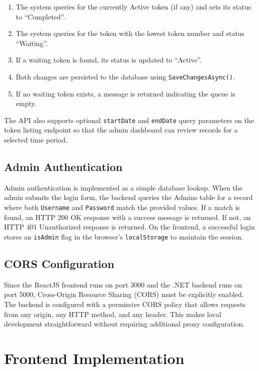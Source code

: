 \begin{enumerate}
    \item The system queries for the currently Active token (if any) and sets its status to ``Completed''.
    \item The system queries for the token with the lowest token number and status ``Waiting''.
    \item If a waiting token is found, its status is updated to ``Active''.
    \item Both changes are persisted to the database using \texttt{SaveChangesAsync()}.
    \item If no waiting token exists, a message is returned indicating the queue is empty.
\end{enumerate}

The API also supports optional \texttt{startDate} and \texttt{endDate} query parameters on the token listing endpoint so that the admin dashboard can review records for a selected time period.

\subsection{Admin Authentication}

Admin authentication is implemented as a simple database lookup. When the admin submits the login form, the backend queries the Admins table for a record where both \texttt{Username} and \texttt{Password} match the provided values. If a match is found, an HTTP 200 OK response with a success message is returned. If not, an HTTP 401 Unauthorized response is returned. On the frontend, a successful login stores an \texttt{isAdmin} flag in the browser's \texttt{localStorage} to maintain the session.

\subsection{CORS Configuration}

Since the ReactJS frontend runs on port 3000 and the .NET backend runs on port 5000, Cross-Origin Resource Sharing (CORS) must be explicitly enabled. The backend is configured with a permissive CORS policy that allows requests from any origin, any HTTP method, and any header. This makes local development straightforward without requiring additional proxy configuration.

\section{Frontend Implementation}

